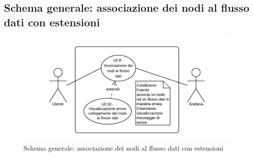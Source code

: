 \subsection{Schema generale: associazione dei nodi al flusso dati con estensioni}
\begin{figure}[H]
\includegraphics{img/UC9 - Schema generale.png}
\caption{Schema generale: associazione dei nodi al flusso dati con estensioni}
\end{figure}

